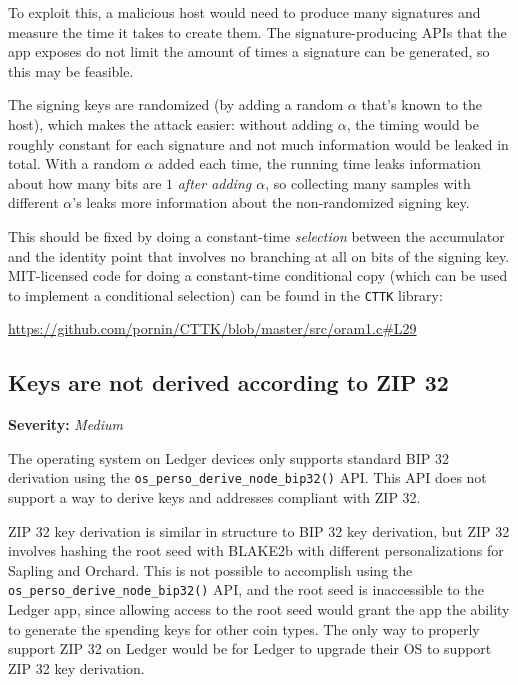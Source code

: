 \documentclass[10pt,titlepage]{article}
\newcommand{\MediumIssue}{\textcolor{darkyellow}{\emph{Medium}}}
\begin{document}
To exploit this, a malicious host would need to produce many signatures and
measure the time it takes to create them. The signature-producing APIs that the
app exposes do not limit the amount of times a signature can be generated, so
this may be feasible. 

The signing keys are randomized (by adding a random $\alpha$ that's known to the
host), which makes the attack easier: without adding $\alpha$, the timing would
be roughly constant for each signature and not much information would be leaked
in total.  With a random $\alpha$ added each time, the running time leaks
information about how many bits are $1$ \emph{after adding $\alpha$}, so
collecting many samples with different $\alpha$'s leaks more information about the
non-randomized signing key.

This should be fixed by doing a constant-time \emph{selection} between the
accumulator and the identity point that involves no branching at all on bits of
the signing key. MIT-licensed code for doing a constant-time conditional copy
(which can be used to implement a conditional selection) can be found in the
\texttt{CTTK} library:

\url{https://github.com/pornin/CTTK/blob/master/src/oram1.c#L29}

\subsection{Keys are not derived according to ZIP 32} \label{issuezip32}
\textbf{Severity:} \MediumIssue

The operating system on Ledger devices only supports standard BIP 32 derivation
using the \texttt{os\_perso\_derive\_node\_bip32()} API. This API does not
support a way to derive keys and addresses compliant with ZIP 32.

ZIP 32 key derivation is similar in structure to BIP 32 key derivation, but ZIP
32 involves hashing the root seed with BLAKE2b with different personalizations
for Sapling and Orchard. This is not possible to accomplish using the
\texttt{os\_perso\_derive\_node\_bip32()} API, and the root seed is inaccessible
to the Ledger app, since allowing access to the root seed would grant the app
the ability to generate the spending keys for other coin types. The only way to
properly support ZIP 32 on Ledger would be for Ledger to upgrade their OS to
support ZIP 32 key derivation.
\end{document}
